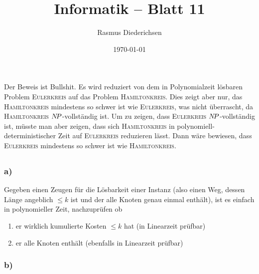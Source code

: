 \documentclass{article}
\title{Informatik \rotatebox[origin=c]{180}{D}\raisebox{2pt}{:} -- Blatt 11}
\author{Rasmus Diederichsen}
\date{\today}
\begin{document}
\maketitle

\section{} 

\subsection{} 

\newcommand{\NP}{N\kern-2ptP}

Der Beweis ist Bullshit. Es wird reduziert von dem in Polynomialzeit lösbaren
Problem \textsc{Eulerkreis} auf das Problem \textsc{Hamiltonkreis}. Dies zeigt
aber nur, das \textsc{Hamiltonkreis} mindestens so schwer ist wie
\textsc{Eulerkreis}, was nicht überrascht, da \textsc{Hamiltonkreis}
$\NP$-vollständig ist. Um zu zeigen, dass
\textsc{Eulerkreis} $\NP$-vollständig ist, müsste man aber zeigen, dass sich
\textsc{Hamiltonkreis} in polynomiell-deterministischer Zeit auf
\textsc{Eulerkreis} reduzieren lässt. Dann wäre bewiesen, dass
\textsc{Eulerkreis} mindestens so schwer ist wie \textsc{Hamiltonkreis}.


\subsection{} 

\subsubsection{a)}

Gegeben einen Zeugen für die Lösbarkeit einer Instanz (also einen Weg, dessen
Länge angeblich $\le k$ ist und der alle Knoten genau einmal enthält), ist es
einfach in polynomieller Zeit, nachzuprüfen ob 
\begin{enumerate}
   \item er wirklich kumulierte Kosten $\le k$ hat (in Linearzeit prüfbar)
   \item er alle Knoten enthält (ebenfalls in Linearzeit prüfbar)
\end{enumerate}

\subsubsection{b)} 
\end{document}
